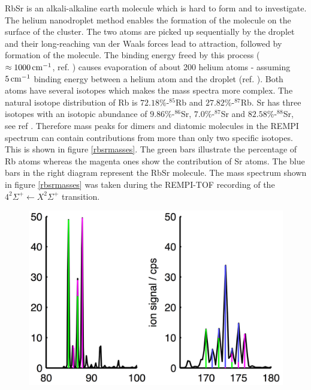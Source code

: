 \documentclass[parskip,12pt,headsepline,a4paper] {scrbook}
\begin{document}
RbSr is an alkali-alkaline earth molecule which is hard to form and to investigate. The helium nanodroplet method enables the formation of the molecule on the surface of the cluster. The two atoms are picked up sequentially by the droplet and their long-reaching van der Waals forces lead to attraction, followed by formation of the molecule. The binding energy freed by this process ($\approx \unit[1000]{cm^{-1}}$, ref. \cite{zuchowski}) causes evaporation of about 200 helium atoms - assuming $\unit[5]{cm^{-1}}$ binding energy between a helium atom and the droplet (ref. \cite{toennis}). Both atoms have several isotopes which makes the mass spectra more complex. The natural isotope distribution of Rb is $72.18\%$-$^{85}$Rb and $27.82\%$-$^{87}$Rb. Sr has three isotopes with an isotopic abundance of $9.86\%$-$^{86}$Sr, $7.0\%$-$^{87}$Sr and $82.58\%$-$^{88}$Sr, see ref \cite{crc}. Therefore mass peaks for dimers and diatomic molecules in the REMPI spectrum can contain contributions from more than only two specific isotopes. This is shown in figure \ref{rbsrmasses}. The green bars illustrate the percentage of Rb atoms whereas the magenta ones show the contribution of Sr atoms. The blue bars in the right diagram represent the RbSr molecule. The mass spectrum shown in figure \ref{rbsrmasses} was taken during the REMPI-TOF recording of the $4 ^2\Sigma^+ \leftarrow X ^2\Sigma^+$ transition.
\begin{figure}[ht]
\centerline{
\includegraphics[width=12cm]{./resultsRbSr/rbsr_masses.jpg}}
\end{figure}
\end{document}
